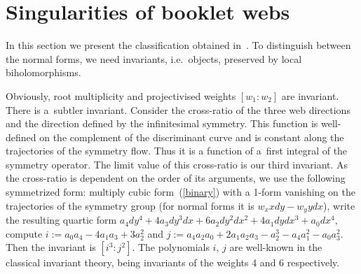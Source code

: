 \documentclass[pdftex]{sigma}
\begin{document}
\section{Singularities of booklet webs}\label{sing}


In this section we present the classif\/ication obtained in~\cite{Ac}. To distinguish between the normal forms, we need invariants, i.e.\ objects, preserved by local biholomorphisms.

Obviously, root multiplicity and projectivised weights $[w_1:w_2]$ are invariant.
There is a~subtler invariant. Consider the cross-ratio of the three web directions
and the direction def\/ined by the inf\/initesimal symmetry.
This function is well-def\/ined on the complement of the discriminant curve
and is constant along the trajectories of the symmetry f\/low.
Thus it is a function of a~f\/irst integral of the symmetry operator.
The limit value of this cross-ratio is our third invariant.
As the cross-ratio is dependent on the order of its arguments,
we use the fol\-lo\-wing symmetrized form: multiply cubic form~(\ref{binary})
with a 1-form vanishing on the trajectories of the symmetry group
(for normal forms it is $w_xxdy-w_yydx$),
write the resulting quartic form $a_4dy^4+4a_3dy^3dx+6a_2dy^2dx^2+4a_1dydx^3+a_0dx^4$,
compute $i:=a_0a_4-4a_1a_3+3a_2^2$ and $j:=a_4a_2a_0+2a_1a_2a_3-a_2^3-a_4a_1^2-a_0a_3^2$.
Then the invariant is $[i^3:j^2]$.
The polynomials $i$, $j$ are well-known in the classical invariant theory,
being invariants of the weights 4 and 6 respectively.
\end{document}
